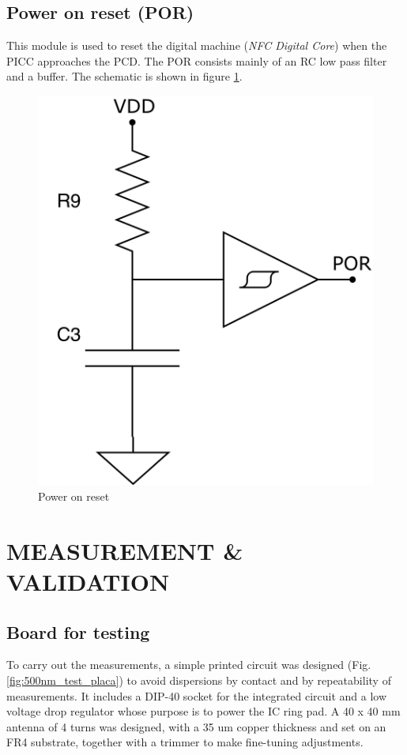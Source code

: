 \documentclass{article} %
\begin{document}
\begin{multicols}{2}
\subsection{Power on reset (POR)}
This module is used to reset the digital machine (\textit{NFC Digital Core}) when the PICC approaches the PCD. The POR consists mainly of an RC low pass filter and a buffer. The schematic is shown in figure \ref{fig:por}.

\begin{figure}[H]


\includegraphics[width=0.3\linewidth]{Images/ImagenesTesina/circuitos/POR.png}
\centering
\caption{Power on reset}
\label{fig:por}
\end{figure}

\section{MEASUREMENT \& VALIDATION}
\subsection{Board for testing}
To carry out the measurements, a simple printed circuit was designed (Fig.   \ref{fig:500nm_test_placa}) to avoid dispersions by contact and by repeatability of measurements. It includes a DIP-40 socket for the integrated circuit and a low voltage drop regulator whose purpose is to power the IC ring pad. A 40 x 40 mm antenna of 4 turns was designed, with a 35 um copper thickness and set on an FR4 substrate, together with a trimmer to make fine-tuning adjustments.


\end{multicols}
\end{document}
